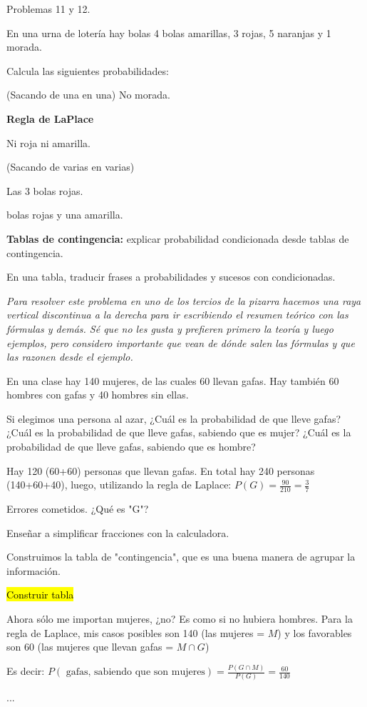 Problemas 11 y 12.

\begin{problem}[2]
En una urna de lotería hay bolas 4 bolas amarillas, 3 rojas, 5 naranjas y 1 morada.

Calcula las siguientes probabilidades:

(Sacando de una en una)
\ppart No morada.

\textbf{Regla de LaPlace}

\ppart Ni roja ni amarilla.

(Sacando de varias en varias)

\ppart Las 3 bolas rojas.

 bolas rojas y una amarilla.

\solution
\end{problem}

\textbf{Tablas de contingencia:} explicar probabilidad condicionada desde tablas de contingencia.

En una tabla, traducir frases a probabilidades y sucesos con condicionadas.

\textit{Para resolver este problema en uno de los tercios de la pizarra hacemos una raya vertical discontinua a la derecha para ir escribiendo el resumen teórico con las fórmulas y demás. Sé que no les gusta y prefieren primero la teoría y luego ejemplos, pero considero importante que vean de dónde salen las fórmulas y que las razonen desde el ejemplo.}


\begin{problem}[G1]
En una clase hay 140 mujeres, de las cuales 60 llevan gafas. Hay también 60 hombres con gafas y 40 hombres sin ellas.

Si elegimos una persona al azar,
\ppart ¿Cuál es la probabilidad de que lleve gafas?
\ppart ¿Cuál es la probabilidad de que lleve gafas, sabiendo que es mujer?
\ppart ¿Cuál es la probabilidad de que lleve gafas, sabiendo que es hombre?

\solution



\spart Hay 120 (60+60) personas que llevan gafas. En total hay 240 personas (140+60+40), luego, utilizando la regla de Laplace:  $P(G) = \frac{90}{210} = \frac{3}{7}$

\obs Errores cometidos. ¿Qué es "G"?

\obs Enseñar a simplificar fracciones con la calculadora.

\obs Construimos la tabla de "contingencia", que es una buena manera de agrupar la información.

\hl{Construir tabla}

\spart Ahora sólo me importan mujeres, ¿no? Es como si no hubiera hombres. Para la regla de Laplace, mis casos posibles son 140 (las mujeres = $M$) y los favorables son 60 (las mujeres que llevan gafas = $M\cap G$)

Es decir: $P(\text{ gafas, sabiendo que son mujeres} ) = \frac{P(G\cap M)}{P(G)} = \frac{60}{140}$

\spart ...

\end{problem}


